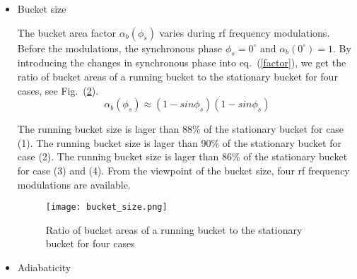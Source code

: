 \begin{itemize}
The rf frequency modulations make the synchronous phase deviate from the norminal value $0^\circ$. Fig.~\ref{synch_phase} shows the changes in the synchronous phase, $\Delta \phi_s$ (t). It is calculated by introducing values into eq.~(\ref{?}). For case (1), the phase jumps in $\Delta \phi_s(t)$ appear at the start and end of the frequency modulation, and at two points where the slope of modulation changes from upward to flat and from flat to downward. For case (2), the phase jumps in $\Delta \phi_s(t)$ appear at the start and end of the frequency modulation, and at the midpoint where the slope of modulation changes from upward to downward. For case (3) and (4), the  synchronous phase $\Delta \phi_s(t)$ during the modulations are continous. The phase jumps are dangerous for the beam to follow. From the view point of the synchronous phase, four cases of rf frequency modulations are available.
\begin{figure}[!htb]
   \centering   
   \texttt{[image: synch\_phase.png]}
   \caption{Changes in synchronous phase for four cases}
   \label{synch_phase}
\end{figure}
\item Bucket size

The bucket area factor $\alpha_b (\phi_s) $ varies during rf frequency modulations. Before the modulations, the synchronous phase $\phi_s=0^\circ$ and  $\alpha_b(0^\circ) = 1$. By introducing the changes in synchronous phase into eq.~(\ref{factor}), we get the ratio of bucket areas of a running bucket to the stationary bucket for four cases, see Fig.~(\ref{bucket_size}).
\begin{equation}
\alpha_b (\phi_s) \approx (1-sin \phi_s)(1-sin \phi_s)\label{factor}
\end{equation}

 The running bucket size is lager than 88$\%$ of the stationary bucket for case (1). The running bucket size is lager than 90$\%$ of the stationary bucket for case (2). The running bucket size is lager than 86$\%$ of the stationary bucket for case (3) and (4). From the viewpoint of the bucket size, four rf frequency modulations are available.  

\begin{figure}[!htb]
   \centering   
   \texttt{[image: bucket\_size.png]}
   \caption{Ratio of bucket areas of a running bucket to the stationary bucket for four cases}
   \label{bucket_size}
\end{figure}
\item Adiabaticity


\end{itemize}
